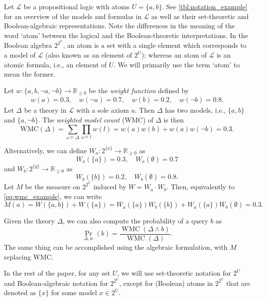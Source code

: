\documentclass{article}
\theoremstyle{definition}
\theoremstyle{remark}
\DeclareMathOperator{\WMC}{WMC}
\begin{document}
Let $\mathcal{L}$ be a propositional logic with atoms $U = \{ a, b \}$. See
\cref{tbl:notation_example} for an overview of the models and formulas in
$\mathcal{L}$ as well as their set-theoretic and Boolean-algebraic
representations. Note the differences in the meaning of the word `atom' between
the logical and the Boolean-theoretic interpretations. In the Boolean algebra
$2^{2^U}$, an atom is a set with a single element which corresponds to a model
of $\mathcal{L}$ (also known as an element of $2^U$); whereas an atom of
$\mathcal{L}$ is an atomic formula, i.e., an element of $U$. We will primarily
use the term `atom' to mean the former.

Let $w\colon \{ a, b, \neg a, \neg b \} \to \mathbb{R}_{\ge 0}$
be the \emph{weight function} defined by
\begin{align*}
  w(a) = 0.3, \quad w(\neg a) = 0.7, \quad w(b) = 0.2, \quad w(\neg b) = 0.8.
\end{align*}
Let $\Delta$ be a theory in $\mathcal{L}$ with a sole axiom $a$. Then
$\Delta$ has two models, i.e., $\{ a, b \}$ and $\{ a, \neg b \}$. The
\emph{weighted model count} (WMC) \cite{DBLP:journals/ai/ChaviraD08} of
$\Delta$ is then
\begin{equation} \label{eq:wmc_example}
  \mathrm{WMC}(\Delta) = \sum_{\omega \models \Delta} \prod_{\omega \models l} w(l) = w(a)w(b) + w(a)w(\neg b) = 0.3.
\end{equation}

Alternatively, we can define $W_a\colon 2^{\{a\}} \to \mathbb{R}_{\ge 0}$ as
\[
  W_a(\{ a \}) = 0.3, \quad W_a(\emptyset) = 0.7
\]
and $W_b\colon 2^{\{q\}} \to \mathbb{R}_{\ge 0}$ as
\[
  W_b(\{ b \}) = 0.2, \quad W_b(\emptyset) = 0.8.
\]
Let $M$ be the measure on $2^{2^U}$ induced by $W = W_a \cdot W_b$. Then,
equivalently to \cref{eq:wmc_example}, we can write
\[
  M(a) = W(\{ a, b \}) + W(\{ a \}) = W_a(\{a\})W_b(\{b\}) +
  W_a(\{a\})W_b(\emptyset) = 0.3.
\]

Given the theory $\Delta$, we can also compute the probability of a query $b$ as
\cite{DBLP:conf/aaai/SangBK05}
\[
  \Pr_{\Delta, w}(b) = \frac{\WMC(\Delta \land b)}{\WMC(\Delta)}.
\]
The same thing can be accomplished using the algebraic formulation, with $M$
replacing $\mathrm{WMC}$.

In the rest of the paper, for any set $U$, we will use set-theoretic notation
for $2^U$ and Boolean-algebraic notation for $2^{2^U}$, except for (Boolean)
atoms in $2^{2^U}$ that are denoted as $\{x\}$ for some model $x \in 2^U$.
\end{document}
